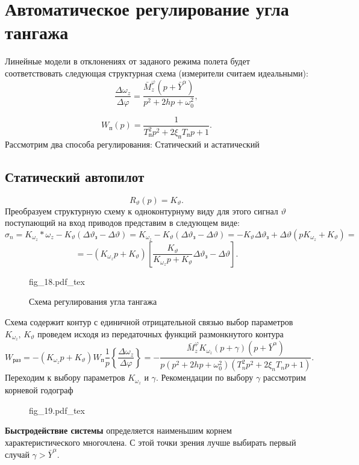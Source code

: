 \documentclass{article}
\begin{document}
\section{Автоматическое регулирование угла тангажа}
Линейные модели в отклонениях от заданого режима полета будет соответствовать следующая структурная схема (измерители считаем идеальными):
\[
	\frac{\Delta \omega_z}{\Delta \varphi} = \frac{\bar{M}_z^\varphi (p+\bar{Y}^\alpha)}{p^2 + 2hp + \omega_{0}^2},
\]

\[
	W_\text{п}(p) = \frac{1}{T_\text{п}^2 p^2 + 2 \xi_\text{п} T_\text{п} p + 1}.
\]
Рассмотрим два способа регулирования: 
Статический и астатический


\subsection{Статический автопилот}
\[
	R_{\vartheta}(p)= K_\vartheta.
\]
Преобразуем структурную схему к одноконтурнуму виду для этого сигнал $\vartheta$ поступающий на вход приводов представим в следующем виде: 
\[
	\sigma_n = K_{\omega_z}*\omega_z - K_\vartheta (\Delta \vartheta_\text{з} - \Delta \vartheta) = K_{\omega_z} - K_{\vartheta}(\Delta \vartheta_\text{з} - \Delta \vartheta) = -K_{\vartheta} \Delta \vartheta_\text{з} + \Delta \vartheta(p K_{\omega_z} + K_{\vartheta}) =
\]
\[
	= -(K_{\omega_z}p + K_\vartheta)[\frac{K_\vartheta}{K_{\omega_z}p + K_{\vartheta}}\Delta\vartheta_\text{з} - \Delta \vartheta].
\]

\begin{figure}[ht]
	\centering
	{fig_18.pdf_tex}
	\caption{Схема регулирования угла тангажа}
	\label{fig:18}
\end{figure}

Схема содержит контур с единичной отрицательной связью выбор параметров $K_{\omega_z}, \, K_{\vartheta}$ проведем исходя из передаточных функций размонкнутого контура
\[
	W_\text{раз} = -(K_{\omega_z} p + K_\vartheta) W_\text{п} \frac{1}{p}\left\{{\frac{\Delta \omega_z}{\Delta \varphi}}\right\} = -\frac{\bar{M}_z^\varphi K_{\omega_{z}}(p + \gamma)(p + \bar{Y}^\alpha)}{p(p^2 + 2hp + \omega_0^2)(T_n^2 p^2 + 2 \xi_n T_n p +1)}.
\]
Переходим к выбору параметров $K_{\omega_z}$ и $\gamma$.
Рекомендации по выбору $\gamma$ рассмотрим корневой годограф 

\begin{figure}[H]
	\centering
	{fig_19.pdf_tex}
\end{figure}

\textbf{Быстродействие системы} определяется наименьшим корнем характеристического многочлена.
С этой точки зрения лучше выбирать первый случай $\gamma > \bar{Y}^\alpha$.
\end{document}
